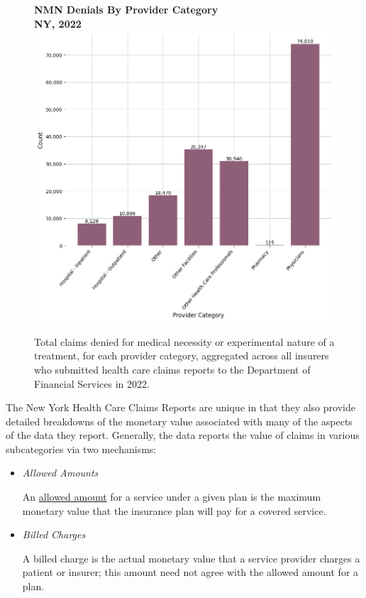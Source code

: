 \documentclass[12pt, a4paper,twoside,parskip=full]{report}
\theoremstyle{plain} %
\theoremstyle{definition} %
\theoremstyle{remark} %
\numberwithin{equation}{chapter}
\begin{document}
		\begin{figure}[h!]
			\centering
			\textbf{NMN Denials By Provider Category}\\
			\textbf{NY, 2022}\\
			\includegraphics[width=\columnwidth]{images/ny_claim_reports/nmn_denials_by_provider_cat.png}
			\caption{Total claims denied for medical necessity or experimental nature of a treatment, for each provider category, aggregated across all insurers who submitted health care claims reports to the Department of Financial Services in 2022.}
			\label{nynmndenialsbyprovidercat}
		\end{figure}
	
	\clearpage
	
	
		The New York Health Care Claims Reports are unique in that they also provide detailed breakdowns of the monetary value associated with many of the aspects of the data they report. Generally, the data reports the value of claims in various subcategories via two mechanisms:
		
		\begin{itemize}
			\item \emph{Allowed Amounts}
			
				An \href{https://www.healthcare.gov/glossary/allowed-amount/}{allowed amount} for a service under a given plan is the maximum monetary value that the insurance plan will pay for a covered service.
				
			\item \emph{Billed Charges}
			
			A billed charge is the actual monetary value that a service provider charges a patient or insurer; this amount need not agree with the allowed amount for a plan.
			
		\end{itemize}
			
\end{document}
